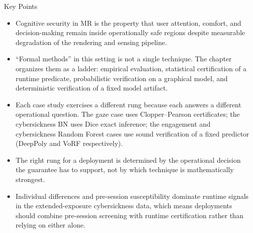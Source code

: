 \documentclass[graybox]{svmult}
\begin{document}
\begin{trailer}{Key Points}
\begin{itemize}
\item Cognitive security in MR is the property that user attention, comfort, and decision-making remain inside operationally safe regions despite measurable degradation of the rendering and sensing pipeline.
\item ``Formal methods'' in this setting is not a single technique. The chapter organizes them as a ladder: empirical evaluation, statistical certification of a runtime predicate, probabilistic verification on a graphical model, and deterministic verification of a fixed model artifact.
\item Each case study exercises a different rung because each answers a different operational question. The gaze case uses Clopper--Pearson certificates; the cybersickness BN uses Dice exact inference; the engagement and cybersickness Random Forest cases use sound verification of a fixed predictor (DeepPoly and VoRF respectively).
\item The right rung for a deployment is determined by the operational decision the guarantee has to support, not by which technique is mathematically strongest.
\item Individual differences and pre-session susceptibility dominate runtime signals in the extended-exposure cybersickness data, which means deployments should combine pre-session screening with runtime certification rather than relying on either alone.
\end{itemize}
\end{trailer}
\end{document}
